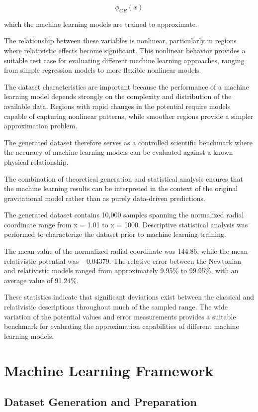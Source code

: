 \documentclass[
]{article}
\begin{document}
\[
\phi_{GR}(x)
\]

which the machine learning models are trained to approximate.

The relationship between these variables is nonlinear, particularly in
regions where relativistic effects become significant. This nonlinear
behavior provides a suitable test case for evaluating different machine
learning approaches, ranging from simple regression models to more
flexible nonlinear models.

The dataset characteristics are important because the performance of a
machine learning model depends strongly on the complexity and
distribution of the available data. Regions with rapid changes in the
potential require models capable of capturing nonlinear patterns, while
smoother regions provide a simpler approximation problem.

The generated dataset therefore serves as a controlled scientific
benchmark where the accuracy of machine learning models can be evaluated
against a known physical relationship.

The combination of theoretical generation and statistical analysis
ensures that the machine learning results can be interpreted in the
context of the original gravitational model rather than as purely
data-driven predictions.

The generated dataset contains 10,000 samples spanning the normalized
radial coordinate range from x = 1.01 to x = 1000. Descriptive
statistical analysis was performed to characterize the dataset prior to
machine learning training.

The mean value of the normalized radial coordinate was 144.86, while the
mean relativistic potential was $-0.04379$. The relative error between the
Newtonian and relativistic models ranged from approximately 9.95\% to
99.95\%, with an average value of 91.24\%.

These statistics indicate that significant deviations exist between the
classical and relativistic descriptions throughout much of the sampled
range. The wide variation of the potential values and error measurements
provides a suitable benchmark for evaluating the approximation
capabilities of different machine learning models.

\section{Machine Learning Framework}\label{machine-learning-framework}

\subsection{Dataset Generation and Preparation}\label{dataset-generation-and-preparation}
\end{document}
